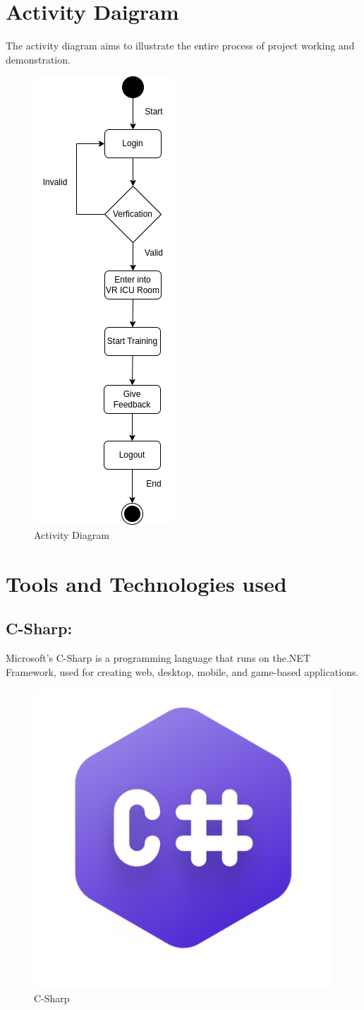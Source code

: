 \section{Activity Daigram}
The activity diagram aims to illustrate the entire process of project working and demonstration.
\begin{figure}[h]
    \centering
    \includegraphics[width=0.25\linewidth]{Images/Activity.drawio.png}
    \caption{Activity Diagram}
\end{figure}

\section{Tools and Technologies used}
\subsection{C-Sharp:}
Microsoft's C-Sharp is a programming language that runs on the.NET Framework, used for creating web, desktop, mobile, and game-based applications.
\begin{figure}[h]
	\centering
	\includegraphics[width=0.2\linewidth, height=0.2\linewidth]{Images/CSharp.png}
	\caption{C-Sharp\cite{csharp}}
\end{figure}

